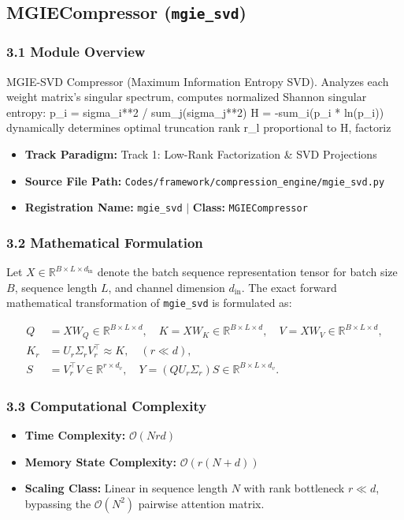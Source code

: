 \subsection{MGIECompressor (\texttt{mgie\_svd})}
\label{sec:app_module_mgie_svd}

\subsubsection*{3.1 Module Overview}
MGIE-SVD Compressor (Maximum Information Entropy SVD).  Analyzes each weight matrix's singular spectrum, computes normalized Shannon singular entropy:     p\_i = sigma\_i**2 / sum\_j(sigma\_j**2)     H = -sum\_i(p\_i * ln(p\_i)) dynamically determines optimal truncation rank r\_l proportional to H, factoriz
\begin{itemize}
    \item \textbf{Track Paradigm:} Track 1: Low-Rank Factorization & SVD Projections
    \item \textbf{Source File Path:} \texttt{Codes/framework/compression\_engine/mgie\_svd.py}
    \item \textbf{Registration Name:} \texttt{mgie\_svd} $\mid$ \textbf{Class:} \texttt{MGIECompressor}
\end{itemize}

\subsubsection*{3.2 Mathematical Formulation}
Let $X \in \mathbb{R}^{B \times L \times d_{\text{in}}}$ denote the batch sequence representation tensor for batch size $B$, sequence length $L$, and channel dimension $d_{\text{in}}$. The exact forward mathematical transformation of \texttt{mgie\_svd} is formulated as:

\begin{align}
Q &= X W_Q \in \mathbb{R}^{B \times L \times d}, \quad K = X W_K \in \mathbb{R}^{B \times L \times d}, \quad V = X W_V \in \mathbb{R}^{B \times L \times d}, \\
K_r &= U_r \Sigma_r V_r^\top \approx K, \quad (r \ll d), \\
S &= V_r^\top V \in \mathbb{R}^{r \times d_v}, \quad Y = (Q U_r \Sigma_r) S \in \mathbb{R}^{B \times L \times d_v}.
\end{align}


\subsubsection*{3.3 Computational Complexity}
\begin{itemize}
    \item \textbf{Time Complexity:} $\mathcal{O}(N r d)$
    \item \textbf{Memory State Complexity:} $\mathcal{O}(r(N + d))$
    \item \textbf{Scaling Class:} Linear in sequence length $N$ with rank bottleneck $r \ll d$, bypassing the $\mathcal{O}(N^2)$ pairwise attention matrix.
\end{itemize}

